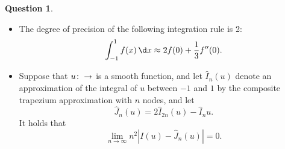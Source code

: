 \documentclass[10pt]{article}
\theoremstyle{definition}
\newtheorem{question}{Question}
\theoremstyle{remark}
\begin{document}
\begin{question}
\begin{enumerate}
\begin{itemize}
                \item
                    The degree of precision of the following integration rule is 2:
                    \[
                        \int_{-1}^{1} f(x) \, \d x \approx
                        2 f(0) + \frac{1}{3} f''(0).
                    \]

                \item
                    Suppose that $u \colon \real \to \real$ is a smooth function,
                    and let $\widehat I_n(u)$ denote an approximation of the integral of $u$ between $-1$ and $1$
                    by the composite trapezium approximation with $n$ nodes,
                    and let
                    \[
                        \widehat J_n(u) = 2 \widehat I_{2n}(u) - \widehat I_n{u}.
                    \]
                    It holds that
                    \[
                        \lim_{n \to \infty} n^2 \left\lvert I(u) - \widehat J_n(u) \right\rvert 
                        = 0.
                    \]
            \end{itemize}

    \end{enumerate}
\end{question}
\end{document}
